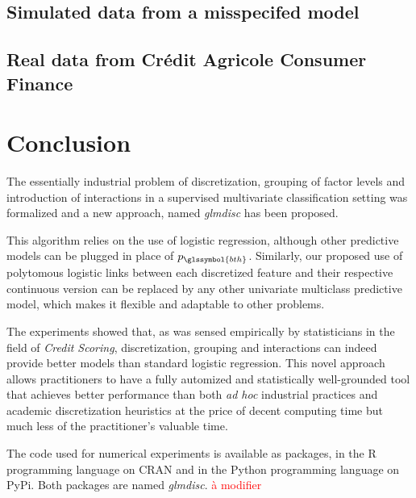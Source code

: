 \subsection{Simulated data from a misspecifed model}

\subsection{Real data from Crédit Agricole Consumer Finance}

\section{Conclusion} \label{sec:ccl}

The essentially industrial problem of discretization, grouping of factor levels and introduction of interactions in a supervised multivariate classification setting was formalized and a new approach, named \textit{glmdisc} has been proposed.

This algorithm relies on the use of logistic regression, although other predictive models can be plugged in place of $p_{\glssymbol{bth}}$. Similarly, our proposed use of polytomous logistic links between each discretized feature and their respective continuous version can be replaced by any other univariate multiclass predictive model, which makes it flexible and adaptable to other problems.

The experiments showed that, as was sensed empirically by statisticians in the field of \textit{Credit Scoring}, discretization, grouping and interactions can indeed provide better models than standard logistic regression. This novel approach allows practitioners to have a fully automized and statistically well-grounded tool that achieves better performance than both \textit{ad hoc} industrial practices and academic discretization heuristics at the price of decent computing time but much less of the practitioner's valuable time.

The code used for numerical experiments is available as packages, in the \textsf{R} programming language on CRAN and in the Python programming language on PyPi. Both packages are named \textit{glmdisc}. \textcolor{red}{à modifier}














\printbibliography[heading=subbibliography, title=Références du chapitre 4]
